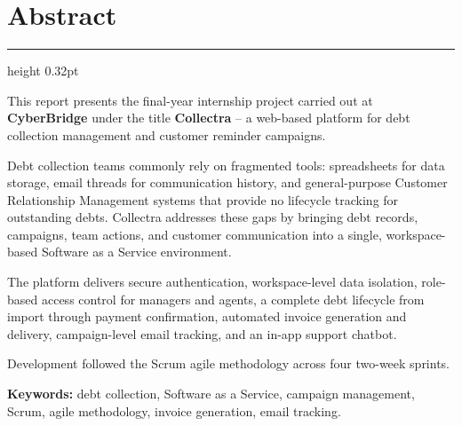 \documentclass[12pt,a4paper]{report}
\newcommand{\sectionrule}{%
  \vspace{-1pt}%
  {\color{accentblue!22}\hrule height 0.32pt}%
  \vspace{5pt}%
}
\begin{document}
\clearpage

\chapter*{Abstract}
{}
\sectionrule

This report presents the final-year internship project carried out at
\textbf{CyberBridge} under the title \textbf{Collectra} --
a web-based platform for debt collection management and customer reminder campaigns.

Debt collection teams commonly rely on fragmented tools: spreadsheets for data
storage, email threads for communication history, and general-purpose Customer
Relationship Management systems that provide no lifecycle tracking for outstanding
debts.
Collectra addresses these gaps by bringing debt records, campaigns, team actions,
and customer communication into a single, workspace-based Software as a Service
environment.

The platform delivers secure authentication, workspace-level data isolation,
role-based access control for managers and agents, a complete debt lifecycle from
import through payment confirmation, automated invoice generation and delivery,
campaign-level email tracking, and an in-app support chatbot.

Development followed the Scrum agile methodology across four two-week sprints.

\medskip
\noindent{\color{accentblue}\rule{2.8cm}{0.55pt}}\par\vspace{0.3em}
\noindent\textbf{Keywords:}
debt collection, Software as a Service, campaign management, Scrum,
agile methodology, invoice generation, email tracking.

\clearpage

\hypersetup{linkcolor=black, urlcolor=black, citecolor=black}
\tableofcontents
\clearpage

\listoffigures
\clearpage

\listoftables
\clearpage

\setcounter{page}{1}
\hypersetup{linkcolor=accentblue, urlcolor=accentblue, citecolor=accentblue}
\pagestyle{mainpagestyle}
\end{document}
